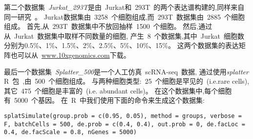 第二个数据集~\textit{Jurkat\_293T}是由~Jurkat和~293T~的两个表达谱构建的,同样来自同一研究~\cite{zheng2017massively}。
Jurkat数据集由~3258~个细胞组成,而~293T~数据集由~2885~个细胞组成。
首先,从~293T~数据集中不放回抽样~1500~个细胞。
然后,通过从~Jurkat~数据集中取样不同数量的细胞,
产生~8~个数据集,其中~Jurkat~细胞数分别为0.5\%、1\%、1.5\%、2\%、2.5\%、5\%、10\%、15\%。
这两个数据集的表达矩阵也可以从~\url{www.10xgenomics.com}下载。

最后一个数据集~\textit{Splatter\_500}是一个人工仿真~scRNA-seq~数据,
通过使用\textit{splatter} R~包~\cite{zappia2017splatter},由~500~个细胞组成。
与两种细胞类型:~25~个细胞是罕见的~(i.e.rare cells),其它~475~个细胞是丰富的~(i.e. abundant cells)。
在这个数据集中,每个细胞有~5000~个基因。
在~R~中我们使用下面的命令来生成这个数据集:

\texttt{splatSimulate(group.prob = c(0.95, 0.05), method = groups, 
verbose = F, batchCells = 500, de.prob = c(0.4, 0.4), out.prob = 0, 
de.facLoc = 0.4, de.facScale = 0.8, nGenes = 5000)}

